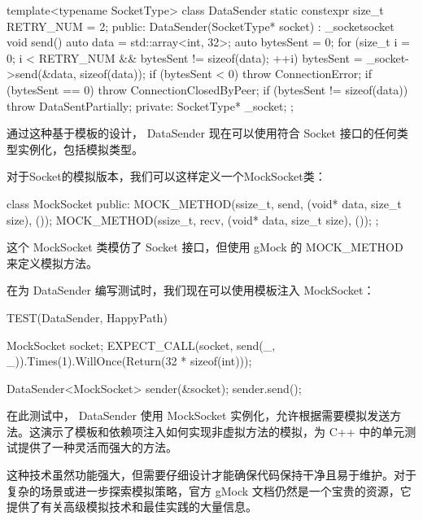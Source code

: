\begin{cpp}
template<typename SocketType>
class DataSender {
    static constexpr size_t RETRY_NUM = 2;
public:
    DataSender(SocketType* socket) : _socket{socket} {}
    void send() {
        auto data = std::array<int, 32>{};
        auto bytesSent = 0;
        for (size_t i = 0; i < RETRY_NUM && bytesSent != sizeof(data); ++i) {
            bytesSent = _socket->send(&data, sizeof(data));
            if (bytesSent < 0) {
                throw ConnectionError{};
            }
            if (bytesSent == 0) {
                throw ConnectionClosedByPeer{};
            }
        }
        if (bytesSent != sizeof(data)) {
            throw DataSentPartially{};
        }
    }
private:
    SocketType* _socket;
};
\end{cpp}

通过这种基于模板的设计， DataSender 现在可以使用符合 Socket 接口的任何类型实例化，包括模拟类型。


对于Socket的模拟版本，我们可以这样定义一个MockSocket类：

\begin{cpp}
class MockSocket {
    public:
    MOCK_METHOD(ssize_t, send, (void* data, size_t size), ());
    MOCK_METHOD(ssize_t, recv, (void* data, size_t size), ());
};
\end{cpp}

这个 MockSocket 类模仿了 Socket 接口，但使用 gMock 的 MOCK\_METHOD 来定义模拟方法。


在为 DataSender 编写测试时，我们现在可以使用模板注入 MockSocket：

\begin{cpp}
TEST(DataSender, HappyPath) {
    MockSocket socket;
    EXPECT_CALL(socket, send(_, _)).Times(1).WillOnce(Return(32 * sizeof(int)));

    DataSender<MockSocket> sender(&socket);
    sender.send();
}
\end{cpp}

在此测试中， DataSender 使用 MockSocket 实例化，允许根据需要模拟发送方法。这演示了模板和依赖项注入如何实现非虚拟方法的模拟，为 C++ 中的单元测试提供了一种灵活而强大的方法。

这种技术虽然功能强大，但需要仔细设计才能确保代码保持干净且易于维护。对于复杂的场景或进一步探索模拟策略，官方 gMock 文档仍然是一个宝贵的资源，它提供了有关高级模拟技术和最佳实践的大量信息。

